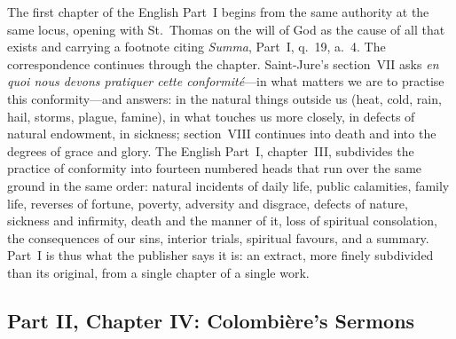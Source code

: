 The first chapter of the English Part~I begins from the same authority at the same locus, opening with St.~Thomas on the will of God as the cause of all that exists and carrying a footnote citing \emph{Summa}, Part~I, q.~19, a.~4. The correspondence continues through the chapter. Saint-Jure's section~VII asks \emph{en quoi nous devons pratiquer cette conformité}---in what matters we are to practise this conformity---and answers: in the natural things outside us (heat, cold, rain, hail, storms, plague, famine), in what touches us more closely, in defects of natural endowment, in sickness; section~VIII continues into death and into the degrees of grace and glory. The English Part~I, chapter~III, subdivides the practice of conformity into fourteen numbered heads that run over the same ground in the same order: natural incidents of daily life, public calamities, family life, reverses of fortune, poverty, adversity and disgrace, defects of nature, sickness and infirmity, death and the manner of it, loss of spiritual consolation, the consequences of our sins, interior trials, spiritual favours, and a summary. Part~I is thus what the publisher says it is: an extract, more finely subdivided than its original, from a single chapter of a single work.

\subsection{Part II, Chapter IV: Colombière's Sermons}

